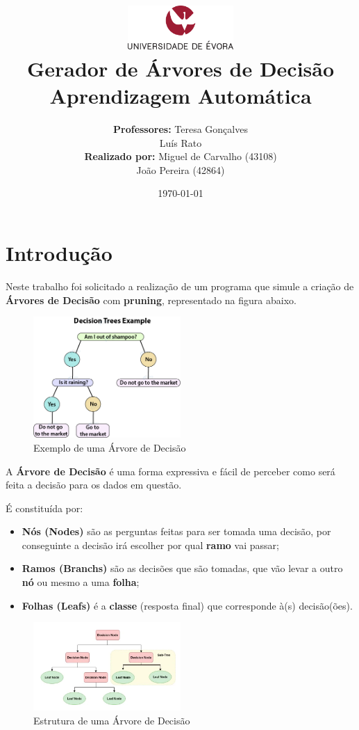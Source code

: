 \documentclass[11pt]{article}   %
\title
{
    \includegraphics[width=0.3\textwidth]{images/logo_universidade.png}
    \\[0.1cm]
    \textbf{Gerador de Árvores de Decisão} \\
    Aprendizagem Automática
}
\author
{
    \textbf{Professores:} Teresa Gonçalves \\ Luís Rato \\
    \textbf{Realizado por:} Miguel de Carvalho (43108) \\ João Pereira (42864) 
}
\date{\today}
\begin{document}
\maketitle

\section{Introdução} 

\hspace{0,5cm}Neste trabalho foi solicitado a realização de um programa que simule a criação de \textbf{Árvores de Decisão} com \textbf{pruning}, 
representado na figura abaixo. \par
\begin{figure}[h!]
    \begin{center}
	\includegraphics[width=0.5\textwidth]{images/tree-example.png}
        \caption{Exemplo de uma Árvore de Decisão}
    \end{center}
\end{figure}
A \textbf{Árvore de Decisão} é uma forma expressiva e fácil de perceber como será feita a decisão para os dados em questão.


É constituída por:
\begin{itemize}
    \item \textbf{Nós (Nodes)} são as perguntas feitas para ser tomada uma decisão, por conseguinte a decisão irá escolher por qual \textbf{ramo} vai passar;
    \item \textbf{Ramos (Branchs)} são as decisões que são tomadas, que vão levar a outro \textbf{nó} ou mesmo a uma \textbf{folha};
    \item \textbf{Folhas (Leafs)} é a \textbf{classe} (resposta final) que corresponde à(s) decisão(ões).
\end{itemize}
\begin{figure}[h!]
    \begin{center}
	\includegraphics[width=0.5\textwidth]{images/tree-structure.png}
        \caption{Estrutura de uma Árvore de Decisão}
    \end{center}
\end{figure}
\end{document}
